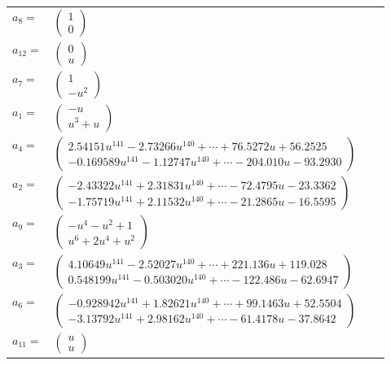 \documentclass[1p]{elsarticle_modified}
\theoremstyle{definition}
\begin{document}
\begin{tabular}{m{7pt} m{180pt} m{7pt} m{180pt} }
\flushright $a_{8}=$&$\begin{pmatrix}1\\0\end{pmatrix}$ \\
\flushright $a_{12}=$&$\begin{pmatrix}0\\u\end{pmatrix}$ \\
\flushright $a_{7}=$&$\begin{pmatrix}1\\- u^2\end{pmatrix}$ \\
\flushright $a_{1}=$&$\begin{pmatrix}- u\\u^3+u\end{pmatrix}$ \\
\flushright $a_{4}=$&$\begin{pmatrix}2.54151 u^{141}-2.73266 u^{140}+\cdots+76.5272 u+56.2525\\-0.169589 u^{141}-1.12747 u^{140}+\cdots-204.010 u-93.2930\end{pmatrix}$ \\
\flushright $a_{2}=$&$\begin{pmatrix}-2.43322 u^{141}+2.31831 u^{140}+\cdots-72.4795 u-23.3362\\-1.75719 u^{141}+2.11532 u^{140}+\cdots-21.2865 u-16.5595\end{pmatrix}$ \\
\flushright $a_{9}=$&$\begin{pmatrix}- u^4- u^2+1\\u^6+2 u^4+u^2\end{pmatrix}$ \\
\flushright $a_{3}=$&$\begin{pmatrix}4.10649 u^{141}-2.52027 u^{140}+\cdots+221.136 u+119.028\\0.548199 u^{141}-0.503020 u^{140}+\cdots-122.486 u-62.6947\end{pmatrix}$ \\
\flushright $a_{6}=$&$\begin{pmatrix}-0.928942 u^{141}+1.82621 u^{140}+\cdots+99.1463 u+52.5504\\-3.13792 u^{141}+2.98162 u^{140}+\cdots-61.4178 u-37.8642\end{pmatrix}$ \\
\flushright $a_{11}=$&$\begin{pmatrix}u\\u\end{pmatrix}$ \\

\end{tabular}
\end{document}
